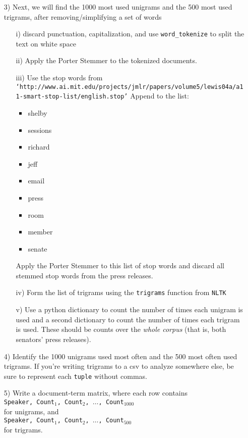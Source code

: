 \documentclass[12pt,letterpaper]{article}
\begin{document}
\begin{itemize}
\item[3)] Next, we will find the 1000 most used unigrams and the 500 most used trigrams, after removing/simplifying a set of words
\begin{itemize}
\item[i)] discard punctuation, capitalization, and use {\tt word\_tokenize} to split the text on white space
\item[ii)] Apply the Porter Stemmer to the tokenized documents.  
\item[iii)] Use the stop words from \\
{\tt `http://www.ai.mit.edu/projects/jmlr/papers/volume5/lewis04a/a11-smart-stop-list/english.stop'}
Append to the list:
\begin{itemize}
\item shelby
\item sessions
\item richard
\item jeff
\item email
\item press 
\item room
\item member 
\item senate
\end{itemize}
Apply the Porter Stemmer to this list of stop words and discard all stemmed stop words from the press releases. 
\item[iv)] Form the list of trigrams using the {\tt trigrams} function from {\tt NLTK}
\item[v)] Use a python dictionary to count the number of times each unigram is used and a second dictionary to count the number of times each trigram is used. These should be counts over the \textit{whole corpus} (that is, both senators' press releases).
\end{itemize}

\item[4)] Identify the 1000 unigrams used most often and the 500 most often used trigrams.  If you're writing trigrams to a csv to analyze somewhere else, be sure to represent each {\tt tuple} without commas.  
\item[5)] Write a document-term matrix, where each row contains \\
{\tt Speaker, Count$_1$, Count$_2$, $\hdots$, Count$_{1000}$ }\\
for unigrams, and \\
{\tt Speaker, Count$_1$, Count$_2$, $\hdots$, Count$_{500}$ }\\
for trigrams. \\


\end{itemize}
\end{document}
